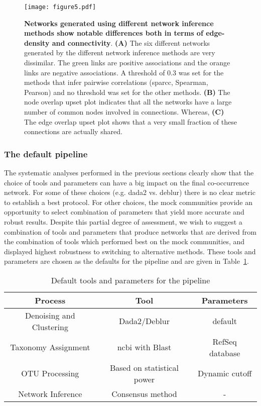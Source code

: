   \begin{figure}[H]
    \centering
    \texttt{[image: figure5.pdf]}
  \end{figure}
  \begin{figure}[t!]
    \centering
    \caption{
      \textbf{Networks generated using different network inference methods show notable differences both in terms of edge-density and connectivity}.
      \textbf{(A)} The six different networks generated by the different network inference methods are very dissimilar.
      The green links are positive associations and the orange links are negative associations.
      A threshold of 0.3 was set for the methods that infer pairwise correlations (\ac{sparcc}, Spearman, Pearson) and no threshold was set for the other methods.
      \textbf{(B)} The node overlap upset plot indicates that all the networks have a large number of common nodes involved in connections.
      Whereas, \textbf{(C)} The edge overlap upset plot shows that a very small fraction of these connections are actually shared.
    }
    \label{fig:figure5}
  \end{figure}

 

  \FloatBarrier

  \subsubsection*{The default pipeline}
  
  The systematic analyses performed in the previous sections clearly show that the choice of tools and parameters can have a big impact on the final co-occurrence network. For some of these choices (e.g. \ac{dada2} vs. deblur) there is no clear metric to establish a best protocol.
  For other choices, the mock communities provide an opportunity to select combination of parameters that yield more accurate and robust results.
  Despite this partial degree of assessment, we wish to suggest a combination of tools and parameters that produce networks that are derived from the combination of tools which performed best on the mock communities, and displayed highest robustness to switching to alternative methods.
  These tools and parameters are chosen as the defaults for the pipeline and are given in Table~\ref{tab:default_options}.

  \begin{table}[h]
    \centering
    \small
    \begin{tabular}{|c|c|c|}
      \hline
      \textbf{Process} & \textbf{Tool} & \textbf{Parameters} \\
      \hline
      Denoising and Clustering & Dada2/Deblur & default \\
      Taxonomy Assignment & \ac{ncbi} with Blast & RefSeq database \\
      OTU Processing & Based on statistical power & Dynamic cutoff \\
      Network Inference & Consensus method & - \\
      \hline
    \end{tabular}
    \caption{Default tools and parameters for the pipeline}
    \label{tab:default_options}
  \end{table}

